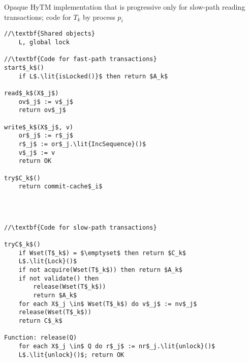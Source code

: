 \begin{algorithm*}[!ht]
\caption{Opaque HyTM implementation that is progressive only for slow-path reading transactions; code for $T_k$ by process $p_i$}
\label{alg:inswrite2}
\vspace{-2mm}
\noindent\lstset{style=customc}
\begin{minipage}{0.43\textwidth}
\begin{lstlisting}[frame=none,firstnumber=1,mathescape=true]
//\textbf{Shared objects}
    L, global lock

//\textbf{Code for fast-path transactions}
start$_k$()
    if L$.\lit{isLocked()}$ then return $A_k$

read$_k$(X$_j$)
    ov$_j$ := v$_j$ 
    return ov$_j$

write$_k$(X$_j$, v)
    or$_j$ := r$_j$ 
    r$_j$ := or$_j.\lit{IncSequence}()$ 
    v$_j$ := v 
    return OK

try$C_k$()
    return commit-cache$_i$ 
\end{lstlisting}
\end{minipage}
\hspace{0.02\textwidth}
\begin{minipage}{0.54\textwidth}
\begin{lstlisting}[frame=none,firstnumber=last,mathescape=true]



//\textbf{Code for slow-path transactions}

tryC$_k$()
    if Wset(T$_k$) = $\emptyset$ then return $C_k$
    L$.\lit{Lock}()$
    if not acquire(Wset(T$_k$)) then return $A_k$
    if not validate() then
        release(Wset(T$_k$))
        return $A_k$
    for each X$_j \in$ Wset(T$_k$) do v$_j$ := nv$_j$
    release(Wset(T$_k$))
    return C$_k$
    
Function: release(Q)
    for each X$_j \in$ Q do r$_j$ := nr$_j.\lit{unlock}()$
    L$.\lit{unlock}()$; return OK
\end{lstlisting}
\end{minipage}
\vspace{-2mm}
\end{algorithm*}

